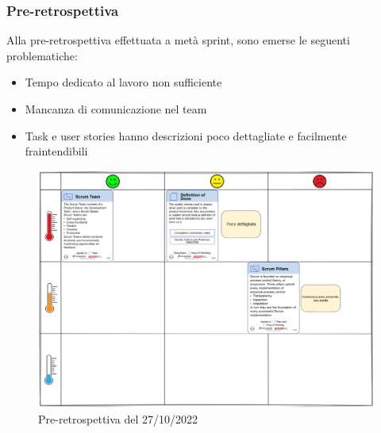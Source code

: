 \subsubsection*{Pre-retrospettiva}
Alla pre-retrospettiva effettuata a metà sprint, sono emerse le seguenti problematiche:
\begin{itemize}
    \item Tempo dedicato al lavoro non sufficiente
    \item Mancanza di comunicazione nel team
    \item Task e user stories hanno descrizioni poco dettagliate e facilmente fraintendibili
\end{itemize}
\begin{figure}[H]
    \centering
    \includegraphics[width=15cm]{./img/sprint1/preretrospettiva.png}
    \caption{Pre-retrospettiva del 27/10/2022}
\end{figure}

